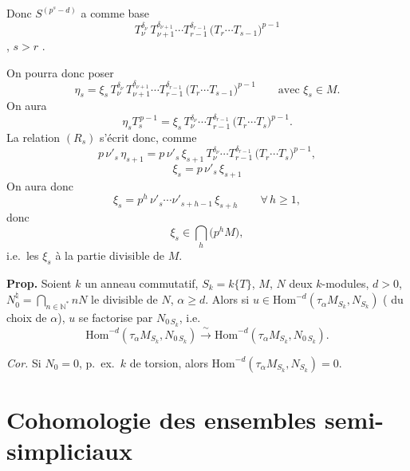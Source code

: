 \documentclass[11pt,a4paper]{article}
\begin{document}
Donc $S^{(p^s-d)}$ a comme base
\[
  T_\nu^{\delta_\nu}\, T_{\nu+1}^{\delta_{\nu+1}} \cdots T_{r-1}^{\delta_{r-1}}\,\bigl(T_r \cdots T_{s-1}\bigr)^{p-1}
\]
, $s > r$ \ill{}.

On pourra donc poser
\[
  \eta_s = \xi_s\, T_\nu^{\delta_\nu}\, T_{\nu+1}^{\delta_{\nu+1}} \cdots T_{r-1}^{\delta_{r-1}}\,\bigl(T_r \cdots T_{s-1}\bigr)^{p-1}
  \qquad \text{avec } \xi_s \in M .
\]
On aura
\[
  \eta_s T_s^{\,p-1} = \xi_s\, T_\nu^{\delta_\nu} \cdots T_{r-1}^{\delta_{r-1}}\,\bigl(T_r \cdots T_s\bigr)^{p-1} .
\]
La relation $(R_s)$ s'écrit donc, comme
\[
  p\,\nu'_s\,\eta_{s+1} = p\,\nu'_s\,\xi_{s+1}\, T_\nu^{\delta_\nu} \cdots T_{r-1}^{\delta_{r-1}}\,\bigl(T_r \cdots T_s\bigr)^{p-1},
\]
\[
  \boxed{\xi_s = p\,\nu'_s\,\xi_{s+1}}
\]
On aura donc
\[
  \xi_s = p^h\, \nu'_s \cdots \nu'_{s+h-1}\, \xi_{s+h} \qquad \forall\, h \geq 1,
\]
donc
\[
  \xi_s \in \bigcap_h \bigl(p^h M\bigr),
\]
i.e.\ les $\xi_s$  à la partie divisible de $M$.

\textbf{Prop.} Soient $k$ un anneau commutatif, $S_k = k\{T\}$, $M$, $N$ deux $k$-modules,
 $d > 0$, $N_0^{\natural} = \bigcap_{n \in \mathbb{N}^{*}} nN$ le 
 divisible de $N$, $\alpha \geq d$. Alors si
$u \in \mathrm{Hom}^{-d}(\tau_\alpha M_{S_k}, N_{S_k})$
(\struck{\ill}    du choix de $\alpha$),
$u$ se factorise par $N_{0\,S_k}$, i.e.
\[
  \mathrm{Hom}^{-d}(\tau_\alpha M_{S_k}, N_{0\,S_k}) \xrightarrow{\ \sim\ } \mathrm{Hom}^{-d}(\tau_\alpha M_{S_k}, N_{0\,S_k}) .
\]

\emph{Cor.} Si $N_0 = 0$, p.~ex.\ $k$ de torsion, alors $\mathrm{Hom}^{-d}(\tau_\alpha M_{S_k}, N_{S_k}) = 0$.

\section{Cohomologie des ensembles semi-simpliciaux}


\end{document}
